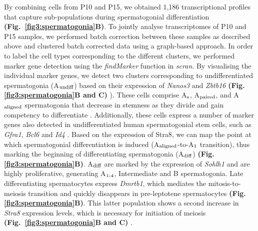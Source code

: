 By combining cells from P10 and P15, we obtained 1,186 transcriptional profiles that capture sub-populations during spermatogonial differentiation \textbf{(Fig.~\ref{fig3:spermatogonia}B)}. To jointly analyse transcriptomes of P10 and P15 samples, we performed batch correction between these samples as described above and clustered batch corrected data using a graph-based approach. In order to label the cell types corresponding to the different clusters, we performed marker gene detection using the \emph{findMarker} function in \emph{scran}. By visualising the individual marker genes, we detect two clusters corresponding to undifferentiated spermatogonia (A$_\textnormal{undiff}$) based on their expression of \textit{Nanos3} and \textit{Zbtb16} \textbf{(Fig. \ref{fig3:spermatogonia}B and C)} \citep{Buaas2004, Lolicato2008}). These cells comprise A$_\textnormal{s}$, A$_\textnormal{paired}$, and A$_\textnormal{aligned}$ spermatogonia that decrease in stemness as they divide and gain competency to differentiate \citep{Suzuki2012}. Additionally, these cells express a number of marker genes also detected in undifferentiated human spermatogonial stem cells, such as \textit{Gfra1}, \textit{Bcl6} and \textit{Id4} \citep{Guo2017}. Based on the expression of \gls{Stra8}, we can map the point at which spermatogonial differentiation is induced (A$_\textnormal{aligned}$-to-A$_\textnormal{1}$ transition), thus marking the beginning of differentiating spermatogonia (A$_\textnormal{diff}$) \citep{Endo2015} \textbf{(Fig. \ref{fig3:spermatogonia}B)}. A$_\textnormal{diff}$ are marked by the expression of \textit{Sohlh1} \citep{Ballow2006} and are highly proliferative, generating A$_\textnormal{1-4}$, Intermediate and B spermatogonia. Late differentiating spermatocytes express \textit{Dmrtb1}, which mediates the mitosis-to-meiosis transition and quickly disappears in pre-leptotene spermatocytes \textbf{(Fig. \ref{fig3:spermatogonia}B)}. This latter population shows a second increase in \textit{Stra8} expression levels, which is necessary for initiation of meiosis \textbf{(Fig.~\ref{fig3:spermatogonia}B and C)} \citep{Anderson2008, Endo2015, Zhang2014}. 

\newpage

